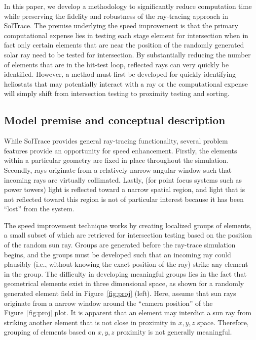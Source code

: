 \documentclass[11pt,letterpaper]{article}
\begin{document}
In this paper, we develop a methodology to significantly reduce computation time while preserving the fidelity and robustness of the ray-tracing approach in SolTrace. 
The premise underlying the speed improvement is that the primary computational expense lies in testing each stage element for intersection when in fact only certain elements that are near the position of the randomly generated solar ray need to be tested for intersection. 
By substantially reducing the number of elements that are in the hit-test loop, reflected rays can very quickly be identified. 
However, a method must first be developed for quickly identifying heliostats that may potentially interact with a ray or the computational expense will simply shift from intersection testing to proximity testing and sorting. 

\subsection{Model premise and conceptual description}
While SolTrace provides general ray-tracing functionality, several problem features provide an opportunity for speed enhancement. 
Firstly, the elements within a particular geometry are fixed in place throughout the simulation. 
Secondly, rays originate from a relatively narrow angular window such that incoming rays are virtually collimated. 
Lastly, (for point focus systems such as power towers) light is reflected toward a narrow spatial region, and light that is not reflected toward this region is not of particular interest because it has been ``lost'' from the system. 

The speed improvement technique works by creating localized groups of elements, a small subset of which are retrieved for intersection testing based on the position of the random sun ray.  
Groups are generated before the ray-trace simulation begins, and the groups must be developed such that an incoming ray could plausibly (i.e., without knowing the exact position of the ray) strike any element in the group. 
The difficulty in developing meaningful groups lies in the fact that geometrical elements exist in three dimensional space, as shown for a randomly generated element field in Figure~\ref{fig:proj} (left). 
Here, assume that sun rays originate from a narrow window around the ``camera position'' of the Figure~\ref{fig:proj} plot. 
It is apparent that an element may interdict a sun ray from striking another element that is not close in proximity in $x,y,z$ space. 
Therefore, grouping of elements based on $x,y,z$ proximity is not generally meaningful. 
\end{document}
